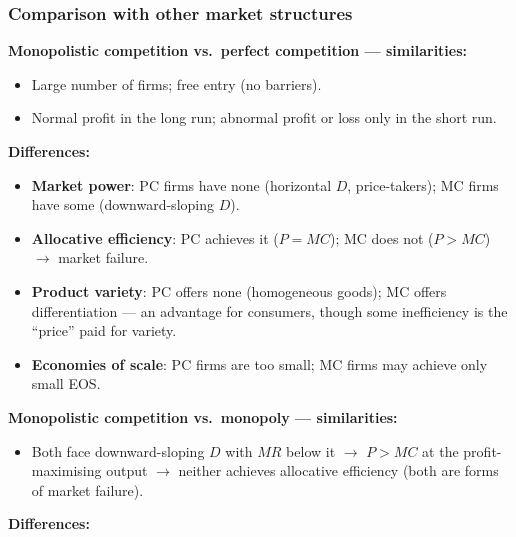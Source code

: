 \subsubsection*{Comparison with other market structures}
\textbf{Monopolistic competition vs.\ perfect competition --- similarities:}
\begin{itemize}
  \item Large number of firms; free entry (no barriers).
  \item Normal profit in the long run; abnormal profit or loss only in the short run.
\end{itemize}
\textbf{Differences:}
\begin{itemize}
  \item \textbf{Market power}: PC firms have none (horizontal $D$, price-takers); MC firms have some (downward-sloping $D$).
  \item \textbf{Allocative efficiency}: PC achieves it ($P = MC$); MC does not ($P > MC$) $\to$ market failure.
  \item \textbf{Product variety}: PC offers none (homogeneous goods); MC offers differentiation --- an advantage for consumers, though some inefficiency is the ``price'' paid for variety.
  \item \textbf{Economies of scale}: PC firms are too small; MC firms may achieve only small EOS.
\end{itemize}
\textbf{Monopolistic competition vs.\ monopoly --- similarities:}
\begin{itemize}
  \item Both face downward-sloping $D$ with $MR$ below it $\to$ $P > MC$ at the profit-maximising output $\to$ neither achieves allocative efficiency (both are forms of market failure).
\end{itemize}
\textbf{Differences:}
